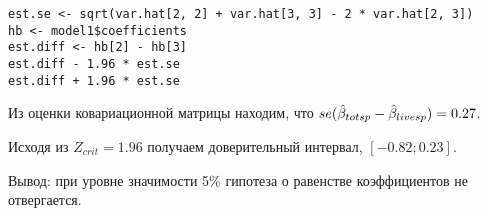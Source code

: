 \begin{problem}
\begin{sol}

\begin{verbatim}
est.se <- sqrt(var.hat[2, 2] + var.hat[3, 3] - 2 * var.hat[2, 3])
hb <- model1$coefficients
est.diff <- hb[2] - hb[3]
est.diff - 1.96 * est.se
est.diff + 1.96 * est.se
\end{verbatim}

Из оценки ковариационной матрицы находим, что $se(\hat{\beta}_{totsp} - \hat{\beta}_{livesp})=0.27$.

Исходя из $Z_{crit}=1.96$ получаем доверительный интервал, $[-0.82; 0.23]$.

Вывод: при уровне значимости 5\% гипотеза о равенстве коэффициентов не отвергается.
\end{sol}
\end{problem}


